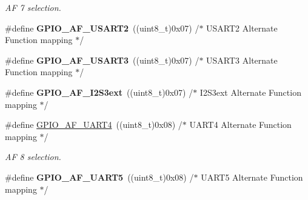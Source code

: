 \begin{DoxyCompactItemize}
\begin{DoxyCompactList}\small\item\em AF 7 selection. \end{DoxyCompactList}\item 
\mbox{\label{group___g_p_i_o___alternat__function__selection__define_ga5e74db1f4d0fc3527aa067093625171b}} 
\#define {\bfseries G\+P\+I\+O\+\_\+\+A\+F\+\_\+\+U\+S\+A\+R\+T2}~((uint8\+\_\+t)0x07)  /$\ast$ U\+S\+A\+R\+T2 Alternate Function mapping $\ast$/
\item 
\mbox{\label{group___g_p_i_o___alternat__function__selection__define_ga97742da355d32c599527813eaf109ec7}} 
\#define {\bfseries G\+P\+I\+O\+\_\+\+A\+F\+\_\+\+U\+S\+A\+R\+T3}~((uint8\+\_\+t)0x07)  /$\ast$ U\+S\+A\+R\+T3 Alternate Function mapping $\ast$/
\item 
\mbox{\label{group___g_p_i_o___alternat__function__selection__define_ga8fac28d42bc99794bb74707c141fc0f6}} 
\#define {\bfseries G\+P\+I\+O\+\_\+\+A\+F\+\_\+\+I2\+S3ext}~((uint8\+\_\+t)0x07)  /$\ast$ I2\+S3ext Alternate Function mapping $\ast$/
\item 
\mbox{\label{group___g_p_i_o___alternat__function__selection__define_gad1754187e64b66681cc1447695062706}} 
\#define \hyperlink{group___g_p_i_o___alternat__function__selection__define_gad1754187e64b66681cc1447695062706}{G\+P\+I\+O\+\_\+\+A\+F\+\_\+\+U\+A\+R\+T4}~((uint8\+\_\+t)0x08)  /$\ast$ U\+A\+R\+T4 Alternate Function mapping $\ast$/
\begin{DoxyCompactList}\small\item\em AF 8 selection. \end{DoxyCompactList}\item 
\mbox{\label{group___g_p_i_o___alternat__function__selection__define_ga6250acb0f2f3de33bc8e78615852cc48}} 
\#define {\bfseries G\+P\+I\+O\+\_\+\+A\+F\+\_\+\+U\+A\+R\+T5}~((uint8\+\_\+t)0x08)  /$\ast$ U\+A\+R\+T5 Alternate Function mapping $\ast$/
\item 
\mbox{\label{group___g_p_i_o___alternat__function__selection__define_gaf69942861848b5175369145ffc001c41}} 

\end{DoxyCompactItemize}
